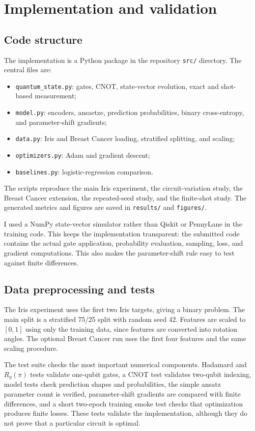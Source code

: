 \documentclass[10pt,a4paper]{article}
\newcommand{\code}[1]{\texttt{#1}}
\begin{document}
\section{Implementation and validation}\label{sec:implementation}
\subsection{Code structure}
The implementation is a Python package in the repository \code{src/} directory. The central files are:
\begin{itemize}
\item \code{quantum\_state.py}: gates, CNOT, state-vector evolution, exact and shot-based measurement;
\item \code{model.py}: encoders, ansaetze, prediction probabilities, binary cross-entropy, and parameter-shift gradients;
\item \code{data.py}: Iris and Breast Cancer loading, stratified splitting, and scaling;
\item \code{optimizers.py}: Adam and gradient descent;
\item \code{baselines.py}: logistic-regression comparison.
\end{itemize}
The scripts reproduce the main Iris experiment, the circuit-variation study, the Breast Cancer extension, the repeated-seed study, and the finite-shot study. The generated metrics and figures are saved in \code{results/} and \code{figures/}.

I used a NumPy state-vector simulator rather than Qiskit or PennyLane in the training code. This keeps the implementation transparent: the submitted code contains the actual gate application, probability evaluation, sampling, loss, and gradient computations. This also makes the parameter-shift rule easy to test against finite differences.

\subsection{Data preprocessing and tests}
The Iris experiment uses the first two Iris targets, giving a binary problem. The main split is a stratified 75/25 split with random seed 42. Features are scaled to \([0,1]\) using only the training data, since features are converted into rotation angles. The optional Breast Cancer run uses the first four features and the same scaling procedure.

The test suite checks the most important numerical components. Hadamard and \(R_y(\pi)\) tests validate one-qubit gates, a CNOT test validates two-qubit indexing, model tests check prediction shapes and probabilities, the simple ansatz parameter count is verified, parameter-shift gradients are compared with finite differences, and a short two-epoch training smoke test checks that optimization produces finite losses. These tests validate the implementation, although they do not prove that a particular circuit is optimal.
\end{document}
